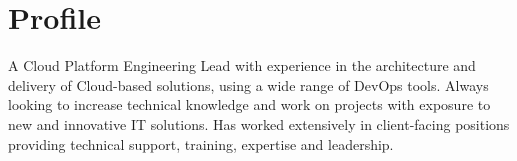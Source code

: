 \section{Profile}

A Cloud Platform Engineering Lead with experience in the architecture and 
delivery of Cloud-based solutions, using a wide range of DevOps tools. 
Always looking to increase technical knowledge and work on projects with 
exposure to new and innovative IT solutions. Has worked extensively in 
client-facing positions providing technical support, training, expertise 
and leadership.

\closesection{}
